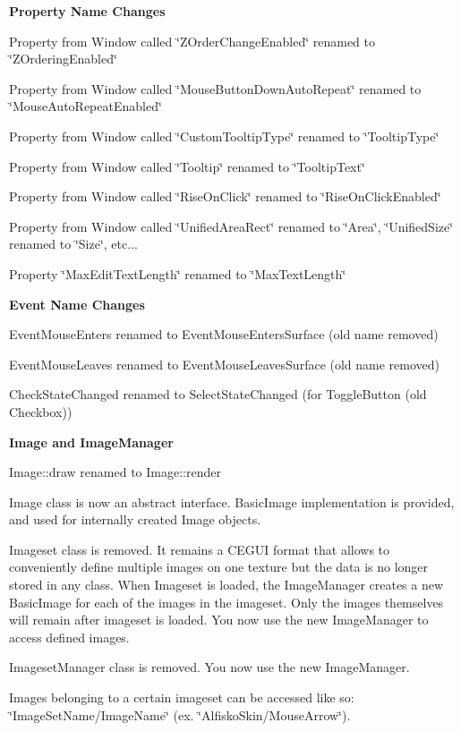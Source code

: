 {\bfseries{ Property Name Changes }}
\begin{DoxyItemize}
\item Property from Window called \char`\"{}\+Z\+Order\+Change\+Enabled\char`\"{} renamed to \char`\"{}\+Z\+Ordering\+Enabled\char`\"{}
\item Property from Window called \char`\"{}\+Mouse\+Button\+Down\+Auto\+Repeat\char`\"{} renamed to \char`\"{}\+Mouse\+Auto\+Repeat\+Enabled\char`\"{}
\item Property from Window called \char`\"{}\+Custom\+Tooltip\+Type\char`\"{} renamed to \char`\"{}\+Tooltip\+Type\char`\"{}
\item Property from Window called \char`\"{}\+Tooltip\char`\"{} renamed to \char`\"{}\+Tooltip\+Text\char`\"{}
\item Property from Window called \char`\"{}\+Rise\+On\+Click\char`\"{} renamed to \char`\"{}\+Rise\+On\+Click\+Enabled\char`\"{}
\item Property from Window called \char`\"{}\+Unified\+Area\+Rect\char`\"{} renamed to \char`\"{}\+Area\char`\"{}, \char`\"{}\+Unified\+Size\char`\"{} renamed to \char`\"{}\+Size\char`\"{}, etc...
\item Property \char`\"{}\+Max\+Edit\+Text\+Length\char`\"{} renamed to \char`\"{}\+Max\+Text\+Length\char`\"{}
\end{DoxyItemize}

{\bfseries{Event Name Changes }}


\begin{DoxyItemize}
\item Event\+Mouse\+Enters renamed to Event\+Mouse\+Enters\+Surface (old name removed)
\item Event\+Mouse\+Leaves renamed to Event\+Mouse\+Leaves\+Surface (old name removed)
\item Check\+State\+Changed renamed to Select\+State\+Changed (for Toggle\+Button (old Checkbox))
\end{DoxyItemize}

{\bfseries{Image and Image\+Manager }}


\begin{DoxyItemize}
\item Image\+::draw renamed to Image\+::render
\item Image class is now an abstract interface. Basic\+Image implementation is provided, and used for internally created Image objects.
\item Imageset class is removed. It remains a C\+E\+G\+UI format that allows to conveniently define multiple images on one texture but the data is no longer stored in any class. When Imageset is loaded, the Image\+Manager creates a new Basic\+Image for each of the images in the imageset. Only the images themselves will remain after imageset is loaded. You now use the new Image\+Manager to access defined images.
\item Imageset\+Manager class is removed. You now use the new Image\+Manager.
\item Images belonging to a certain imageset can be accessed like so\+: \char`\"{}\+Image\+Set\+Name/\+Image\+Name\char`\"{} (ex. \char`\"{}\+Alfisko\+Skin/\+Mouse\+Arrow\char`\"{}).
\end{DoxyItemize}

